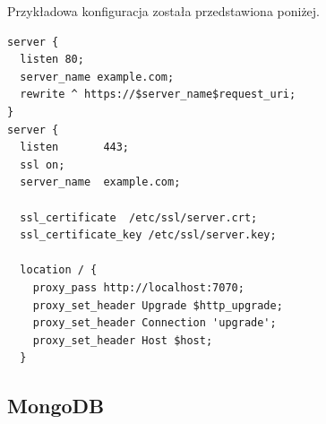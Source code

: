 \documentclass[12pt,a4paper,notitlepage]{article}
\begin{document}
\par Przykładowa konfiguracja została przedstawiona poniżej.

\begin{lstlisting}
server {
  listen 80;
  server_name example.com;
  rewrite ^ https://$server_name$request_uri;
}
server {
  listen       443;
  ssl on;
  server_name  example.com;

  ssl_certificate  /etc/ssl/server.crt;
  ssl_certificate_key /etc/ssl/server.key;

  location / {
    proxy_pass http://localhost:7070;
    proxy_set_header Upgrade $http_upgrade;
    proxy_set_header Connection 'upgrade';
    proxy_set_header Host $host;
  }
\end{lstlisting}

\subsection{MongoDB}
\end{document}
